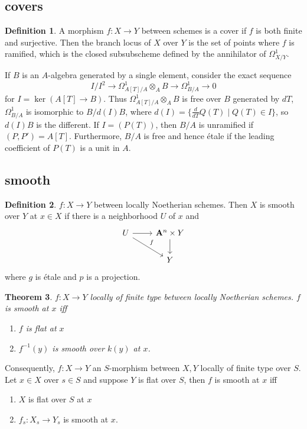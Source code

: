 \documentclass[leqno]{amsart}
\newcommand{\A}{\mathbf A}
\newcommand{\1}{\mathbf{1}}
\newtheorem{thm}{Theorem}[section]
\theoremstyle{definition}
\newtheorem{defn}[thm]{Definition}
\theoremstyle{remark}
\begin{document}
\subsection{covers}
\begin{defn}
	A morphism $f\colon X\to Y$ between schemes
	is a cover if $f$ is both finite and surjective.
	Then the branch locus of $X$ over  $Y$
	is the set of points where $f$ is ramified,
	which is the closed subsubscheme
	defined by the annihilator of $\Omega^1_{X/Y}$.
\end{defn}

If $B$ is an  $A$-algebra generated by a single element,
consider the exact sequence
\[
	 I/I^2\to \Omega^1_{A[T]/A}\otimes_AB
	 \to \Omega^1_{B/A}\to 0
\]
for $I=\ker(A[T]\to B)$.
Thus $\Omega^1_{A[T]/A}\otimes_AB$ 
is free over $B$ generated by $dT$,
$\Omega^1_{B/A}$ is isomorphic to $B/d(I)B$,
where $d(I)=\{\frac{d}{dT}Q(T)\mid Q(T)\in I\}$,
so $d(I)B$ is the different.
If $I=(P(T))$, then
$B/A$ is unramified if $(P,P')=A[T]$.
Furthermore, $B/A$ is free and hence \'{e}tale
if the leading coefficient of $P(T)$ is a unit in $A$.

\subsection{smooth}

\begin{defn}
	$f\colon X\to Y$
	between locally Noetherian schemes.
	Then  $X$ is smooth over  $Y$
	at  $x\in X$ if there is a neighborhood
	 $U$ of  $x$ and
	  \[
	 	\begin{tikzcd}
			U\arrow[r]\arrow[dr,"f"]
			& \A^n\times Y\arrow[d]\\
			& Y
	 	\end{tikzcd}
	 \]
	 where $g$ is \'{e}tale and  $p$ is 
	 a projection.
\end{defn}

\begin{thm}
	$f\colon X\to Y$
	locally of finite type
	between locally Noetherian schemes.
	 $f$ is smooth at  $x$ iff
	  \begin{enumerate}[label=(\alph*)]
	 	\item $f$ is flat at  $x$
		\item $f^{-1}(y)$
			is smooth over  $k(y)$
			at  $x$.
	 \end{enumerate}
\end{thm}

Consequently,
$f\colon X\to Y$ an  $S$-morphism
between  $X,Y$ locally of finite type over  $S$.
Let  $x\in X$ over  $s\in S$
and suppose  $Y$ is flat over  $S$,
then  $f$ is smooth at  $x$ iff
 \begin{enumerate}[label=(\alph*)]
	\item $X$ is flat over  $S$ at  $x$
	\item  $f_s\colon X_s\to Y_s$
		is smooth at  $x$.
\end{enumerate}
\end{document}
